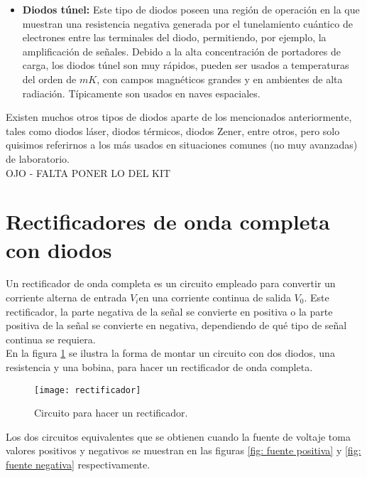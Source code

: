 \documentclass{scrartcl}
\begin{document}
\begin{itemize}
	\item \textbf{Diodos túnel:} Este tipo de diodos poseen una región de operación en la que muestran una resistencia negativa generada por el tunelamiento cuántico de electrones entre las terminales del diodo, permitiendo, por ejemplo, la amplificación de señales. Debido a la alta concentración de portadores de carga, los diodos túnel	son muy rápidos, pueden ser usados a temperaturas del orden de $mK$, con campos magnéticos grandes y en ambientes de alta radiación. Típicamente son usados en naves espaciales.

\end{itemize}

Existen muchos otros tipos de diodos aparte de los mencionados anteriormente, tales como diodos láser, diodos térmicos, diodos Zener, entre otros, pero solo quisimos referirnos a los más usados en situaciones comunes (no muy avanzadas) de laboratorio.\\

OJO - FALTA PONER LO DEL KIT	

\section{Rectificadores de onda completa con diodos}

Un rectificador de onda completa es un circuito empleado para convertir un corriente alterna de entrada $V_{i}$en una corriente continua de salida $V_{0}$. Este rectificador, la parte negativa de la señal se convierte en positiva o la parte positiva de la señal se convierte en negativa, dependiendo de qué tipo de señal continua se requiera.\\

En la figura \ref{fig: rectificador} se ilustra la forma de montar un circuito con dos diodos, una resistencia y una bobina, para hacer un rectificador de onda completa.\\

\begin{figure}[h!]
	\centering
	\texttt{[image: rectificador]}
	\caption{Circuito para hacer un rectificador.}
	\label{fig: rectificador}
\end{figure}

Los dos circuitos equivalentes que se obtienen cuando la fuente de voltaje toma valores positivos y negativos se muestran en las figuras \ref{fig: fuente positiva} y \ref{fig: fuente negativa} respectivamente. \\
\end{document}
